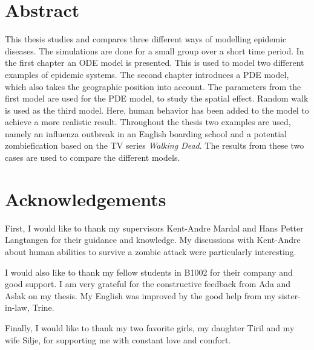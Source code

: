 \documentclass[%
twoside,                 %
final,                   %
chapterprefix=true,      %
open=right               %
10pt]{book}
\begin{document}



\newcommand{\Imax}{I_{\textrm{max}}}

\chapter*{Abstract}
This thesis studies and compares three different ways of modelling epidemic diseases. The simulations are done for a small group over a short time period. In the first chapter an ODE model is presented. This is used to model two different examples of epidemic systems. The second chapter introduces a PDE model, which also takes the geographic position into account. The parameters from the first model are used for the PDE model, to study the spatial effect. Random walk is used as the third model. Here, human behavior has been added to the model to achieve a more realistic result. Throughout the thesis two examples are used, namely an influenza outbreak in an English boarding school and a potential zombiefication based on the TV series \emph{Walking Dead}. The results from these two cases are used to compare the different models. 

\chapter*{Acknowledgements}
First, I would like to thank my supervisors Kent-Andre Mardal and Hans Petter Langtangen for their guidance and knowledge. My discussions with Kent-Andre about human abilities to survive a zombie attack were particularly interesting. 


\vspace{3mm}


I would also like to thank my fellow students in B1002 for their company and good support. I am very grateful for the constructive feedback from Ada and Aslak on my thesis. My English was improved by the good help from my sister-in-law, Trine.


\vspace{3mm}


Finally, I would like to thank my two favorite girls, my daughter Tiril and my wife Silje, for supporting me with constant love and comfort.     



\tableofcontents


\vspace{1cm} %
\end{document}
